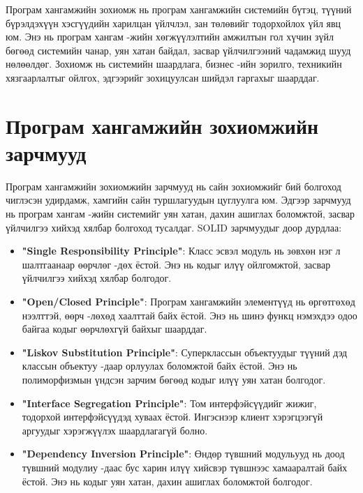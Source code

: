 Програм хангамжийн зохиомж нь програм хангамжийн системийн бүтэц, түүний бүрэлдэхүүн хэсгүүдийн харилцан үйлчлэл, зан төлөвийг тодорхойлох үйл явц юм. Энэ нь програм хангам -жийн хөгжүүлэлтийн амжилтын гол хүчин зүйл бөгөөд системийн чанар, уян хатан байдал, засвар үйлчилгээний чадамжид шууд нөлөөлдөг. Зохиомж нь системийн шаардлага, бизнес -ийн зорилго, техникийн хязгаарлалтыг ойлгох, эдгээрийг зохицуулсан шийдэл гаргахыг шаарддаг.
\section{Програм хангамжийн зохиомжийн зарчмууд}
Програм хангамжийн зохиомжийн зарчмууд нь сайн зохиомжийг бий болгоход чиглэсэн удирдамж, хамгийн сайн туршлагуудын цуглуулга юм. Эдгээр зарчмууд нь програм хангам -жийн системийг уян хатан, дахин ашиглах боломжтой, засвар үйлчилгээ хийхэд хялбар болгоход тусалдаг. SOLID зарчмуудыг доор дурдлаа:
\begin{itemize}
	\item \textbf{"Single Responsibility Principle"}: Класс эсвэл модуль нь зөвхөн нэг л шалтгаанаар өөрчлөг -дөх ёстой. Энэ нь кодыг илүү ойлгомжтой, засвар үйлчилгээ хийхэд хялбар болгодог.
	\item \textbf{"Open/Closed Principle"}: Програм хангамжийн элементүүд нь өргөтгөхөд нээлттэй, өөрч -лөхөд хаалттай байх ёстой. Энэ нь шинэ функц нэмэхдээ одоо байгаа кодыг өөрчлөхгүй байхыг шаарддаг.
	\item \textbf{"Liskov Substitution Principle"}: Суперклассын объектуудыг түүний дэд классын объектуу -даар орлуулах боломжтой байх ёстой. Энэ нь полиморфизмын үндсэн зарчим бөгөөд кодыг илүү уян хатан болгодог.
	\item \textbf{"Interface Segregation Principle"}: Том интерфэйсүүдийг жижиг, тодорхой интерфэйсүүдэд хуваах ёстой. Ингэснээр клиент хэрэгцээгүй аргуудыг хэрэгжүүлэх шаардлагагүй болно.
	\item \textbf{"Dependency Inversion Principle"}: Өндөр түвшний модульууд нь доод түвшний модулиу -даас бус харин илүү хийсвэр түвшнээс хамааралтай байх ёстой. Энэ нь кодыг уян хатан, дахин ашиглах боломжтой болгодог.
\end{itemize}
